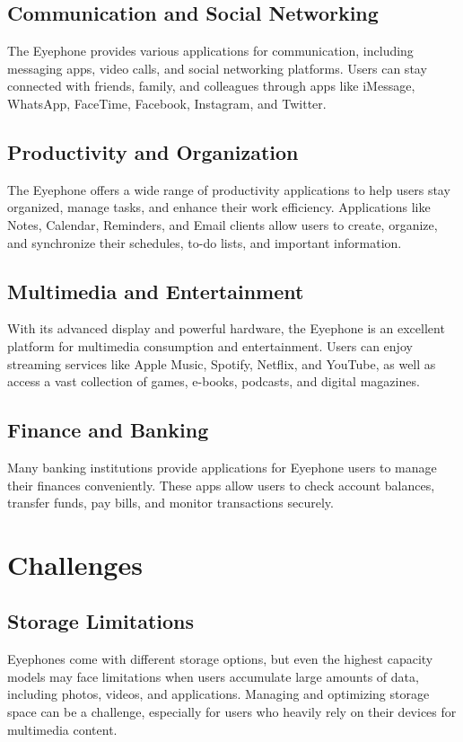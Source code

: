 \documentclass[a4paper,11pt]{report}
\begin{document}
\section{Communication and Social Networking}
The Eyephone provides various applications for communication, including messaging apps, video calls, and social networking platforms. Users can stay connected with friends, family, and colleagues through apps like iMessage, WhatsApp, FaceTime, Facebook, Instagram, and Twitter.
	
\section{Productivity and Organization}
The Eyephone offers a wide range of productivity applications to help users stay organized, manage tasks, and enhance their work efficiency. Applications like Notes, Calendar, Reminders, and Email clients allow users to create, organize, and synchronize their schedules, to-do lists, and important information.

\section{Multimedia and Entertainment}
With its advanced display and powerful hardware, the Eyephone is an excellent platform for multimedia consumption and entertainment. Users can enjoy streaming services like Apple Music, Spotify, Netflix, and YouTube, as well as access a vast collection of games, e-books, podcasts, and digital magazines.

\section{Finance and Banking}
Many banking institutions provide applications for Eyephone users to manage their finances conveniently. These apps allow users to check account balances, transfer funds, pay bills, and monitor transactions securely.

\chapter{Challenges}

\section{Storage Limitations}
Eyephones come with different storage options, but even the highest capacity models may face limitations when users accumulate large amounts of data, including photos, videos, and applications. Managing and optimizing storage space can be a challenge, especially for users who heavily rely on their devices for multimedia content.
\end{document}
